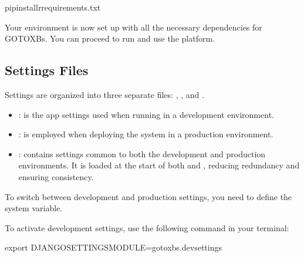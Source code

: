 \documentclass[letterpaper,10pt,english]{sphinxmanual}
\begin{document}
\begin{sphinxVerbatim}[commandchars=\\\{\}]
pipinstall\PYGZhy{}rrequirements.txt
\end{sphinxVerbatim}

\sphinxAtStartPar
Your environment is now set up with all the necessary dependencies for GOTO\sphinxhyphen{}XBs. You can proceed to run and use the platform.


\subsection{Settings Files}
\label{\detokenize{quick_start:settings-files}}
\sphinxAtStartPar
Settings are organized into three separate files: , , and .
\begin{itemize}
\item {} 
\sphinxAtStartPar
{}: is the app settings used when running in a development environment.

\item {} 
\sphinxAtStartPar
{}: is employed when deploying the system in a production environment.

\item {} 
\sphinxAtStartPar
{}: contains settings common to both the development and production environments. It is loaded at the start of both  and , reducing redundancy and ensuring consistency.

\end{itemize}

\sphinxAtStartPar
To switch between development and production settings, you need to define the  system variable.

\sphinxAtStartPar
To activate development settings, use the following command in your terminal:

\begin{sphinxVerbatim}[commandchars=\\\{\}]
\PYGZdl{} export DJANGO\PYGZus{}SETTINGS\PYGZus{}MODULE=goto\PYGZus{}xbs.dev\PYGZus{}settings
\end{sphinxVerbatim}
\end{document}
